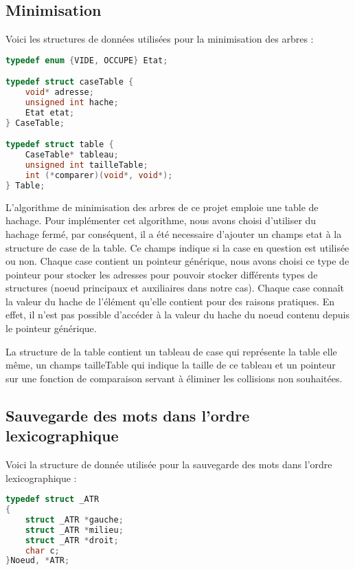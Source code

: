 \documentclass[15pt, a4paper]{article}
\begin{document}
\subsection{Minimisation}

\noindent Voici les structures de données utilisées pour la minimisation des arbres :

\begin{lstlisting}[language=c]
typedef enum {VIDE, OCCUPE} Etat;

typedef struct caseTable {
    void* adresse;
    unsigned int hache;
    Etat etat;
} CaseTable;

typedef struct table {
    CaseTable* tableau;
    unsigned int tailleTable;
    int (*comparer)(void*, void*);
} Table;
\end{lstlisting}

L'algorithme de minimisation des arbres de ce projet emploie une table
de hachage. Pour implémenter cet algorithme, nous avons choisi
d'utiliser du hachage fermé, par conséquent, il a été necessaire
d'ajouter un champs etat à la structure de case de la table. Ce champs
indique si la case en question est utilisée ou non. Chaque case contient
un pointeur générique, nous avons choisi ce type de pointeur pour
stocker les adresses pour pouvoir stocker différents types de structures
(noeud principaux et auxiliaires dans notre cas). Chaque case connaît
la valeur du hache de l'élément qu'elle contient pour des raisons
pratiques. En effet, il n'est pas possible d'accéder à la valeur du
hache du noeud contenu depuis le pointeur générique.

\bigskip

La structure de la table contient un tableau de case qui représente la
table elle même, un champs tailleTable qui indique la taille de ce 
tableau et un pointeur sur une fonction de comparaison servant à
éliminer les collisions non souhaitées.

\subsection{Sauvegarde des mots dans l'ordre lexicographique}

Voici la structure de donnée utilisée pour la sauvegarde des mots dans l'ordre 
lexicographique :

\begin{lstlisting}[language=c]
typedef struct _ATR
{
    struct _ATR *gauche;
    struct _ATR *milieu;
    struct _ATR *droit;
    char c;
}Noeud, *ATR;
\end{lstlisting}
\end{document}
